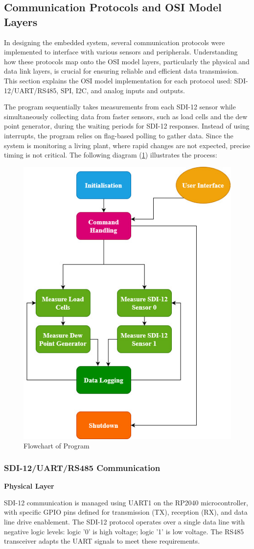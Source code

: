 \subsection{Communication Protocols and OSI Model Layers}

In designing the embedded system, several communication protocols were implemented 
to interface with various sensors and peripherals. Understanding how these protocols 
map onto the OSI model layers, particularly the physical and data link layers, is 
crucial for ensuring reliable and efficient data transmission. This section explains 
the OSI model implementation for each protocol used: SDI-12/UART/RS485, SPI, I2C, 
and analog inputs and outputs.

The program sequentially takes measurements from each SDI-12 sensor while simultaneously 
collecting data from faster sensors, such as load cells and the dew point generator, during 
the waiting periods for SDI-12 responses. Instead of using interrupts, the program relies 
on flag-based polling to gather data. Since the system is monitoring a living plant, 
where rapid changes are not expected, precise timing is not critical. The following 
diagram (\cref{flowchart})  illustrates the process: 

\begin{figure}
    \includegraphics[width=0.4\linewidth]{figures/program_flowchart.jpg}
    \caption{Flowchart of Program}
    \label{flowchart}
\end{figure}

\subsubsection{SDI-12/UART/RS485 Communication}

\textbf{Physical Layer}

SDI-12 communication is managed using UART1 on the RP2040 microcontroller, with specific 
GPIO pins defined for transmission (TX), reception (RX), and data line drive enablement. The SDI-12 protocol operates over a single data line with negative logic levels: logic '0' is high voltage; logic '1' is low voltage. The RS485 transceiver adapts the UART signals to meet these requirements.

